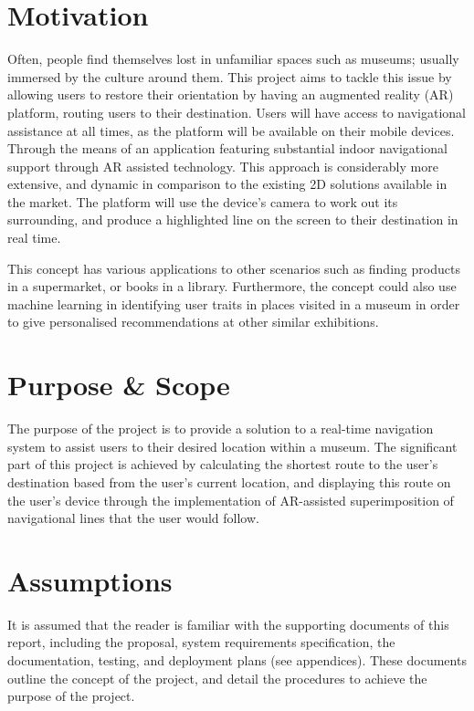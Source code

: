 \section{Motivation}
Often, people find themselves lost in unfamiliar spaces such as museums; usually immersed by the culture around them. This project aims to tackle this issue by allowing users to restore their orientation by having an augmented reality (AR) platform, routing users to their destination. Users will have access to navigational assistance at all times, as the platform will be available on their mobile devices. Through the means of an application featuring substantial indoor navigational support through AR assisted technology. This approach is considerably more extensive, and dynamic in comparison to the existing 2D solutions available in the market. The platform will use the device's camera to work out its surrounding, and produce a highlighted line on the screen to their destination in real time.

This concept has various applications to other scenarios such as finding products in a supermarket, or books in a library. Furthermore, the concept could also use machine learning in identifying user traits in places visited in a museum in order to give personalised recommendations at other similar exhibitions.

\section{Purpose \& Scope}
The purpose of the project is to provide a solution to a real-time navigation system to assist users to their desired location within a museum. The significant part of this project is achieved by calculating the shortest route to the user's destination based from the user's current location, and displaying this route on the user's device through the implementation of AR-assisted superimposition of navigational lines that the user would follow.

\section{Assumptions}
It is assumed that the reader is familiar with the supporting documents of this report, including the proposal, system requirements specification, the documentation, testing, and deployment plans (see appendices). These documents outline the concept of the project, and detail the procedures to achieve the purpose of the project.

